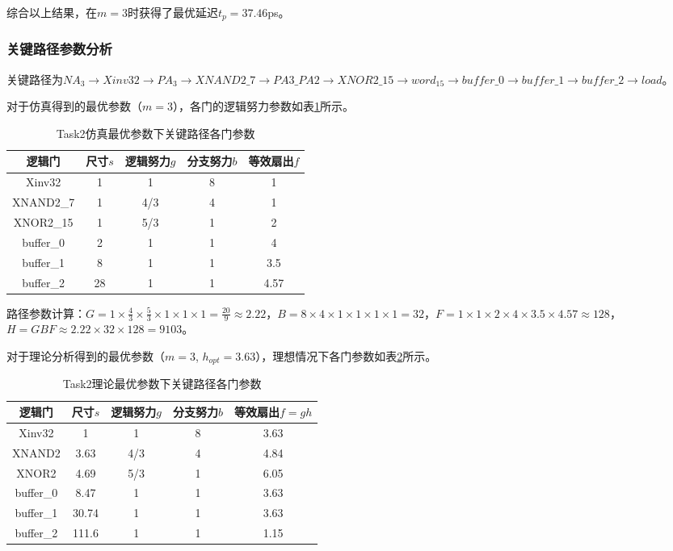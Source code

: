 \documentclass[UTF8,12pt,a4paper]{ctexart}
\begin{document}
综合以上结果，在$m = 3$时获得了最优延迟$t_p = 37.46$ps。

\subsubsection{关键路径参数分析}

关键路径为$NA_3 \rightarrow Xinv32 \rightarrow PA_3 \rightarrow XNAND2\_7 \rightarrow PA3\_PA2 \rightarrow XNOR2\_15 \rightarrow word_{15} \rightarrow buffer\_0 \rightarrow buffer\_1 \rightarrow buffer\_2 \rightarrow load$。

对于仿真得到的最优参数（$m=3$），各门的逻辑努力参数如表\ref{tab:task2_sim_params}所示。

\begin{table}[htbp]
\centering
\caption{Task2仿真最优参数下关键路径各门参数}
\label{tab:task2_sim_params}
\begin{tabular}{|c|c|c|c|c|}
\hline
逻辑门 & 尺寸$s$ & 逻辑努力$g$ & 分支努力$b$ & 等效扇出$f$ \\
\hline
Xinv32 & 1 & 1 & 8 & 1 \\
XNAND2\_7 & 1 & 4/3 & 4 & 1 \\
XNOR2\_15 & 1 & 5/3 & 1 & 2 \\
buffer\_0 & 2 & 1 & 1 & 4 \\
buffer\_1 & 8 & 1 & 1 & 3.5 \\
buffer\_2 & 28 & 1 & 1 & 4.57 \\
\hline
\end{tabular}
\end{table}

路径参数计算：$G = 1 \times \frac{4}{3} \times \frac{5}{3} \times 1 \times 1 \times 1 = \frac{20}{9} \approx 2.22$，$B = 8 \times 4 \times 1 \times 1 \times 1 \times 1 = 32$，$F = 1 \times 1 \times 2 \times 4 \times 3.5 \times 4.57 \approx 128$，$H = GBF \approx 2.22 \times 32 \times 128 = 9103$。

对于理论分析得到的最优参数（$m=3$, $h_{opt}=3.63$），理想情况下各门参数如表\ref{tab:task2_theo_params}所示。

\begin{table}[htbp]
\centering
\caption{Task2理论最优参数下关键路径各门参数}
\label{tab:task2_theo_params}
\begin{tabular}{|c|c|c|c|c|}
\hline
逻辑门 & 尺寸$s$ & 逻辑努力$g$ & 分支努力$b$ & 等效扇出$f=gh$ \\
\hline
Xinv32 & 1 & 1 & 8 & 3.63 \\
XNAND2 & 3.63 & 4/3 & 4 & 4.84 \\
XNOR2 & 4.69 & 5/3 & 1 & 6.05 \\
buffer\_0 & 8.47 & 1 & 1 & 3.63 \\
buffer\_1 & 30.74 & 1 & 1 & 3.63 \\
buffer\_2 & 111.6 & 1 & 1 & 1.15 \\
\hline
\end{tabular}
\end{table}
\end{document}
